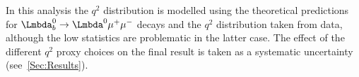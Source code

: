 
In this analysis the $q^{2}$ distribution is modelled using the theoretical predictions for $\Lb\to\PLambda^{0}\mup\mun$ decays and the $q^{2}$ distribution taken from \LbK data, although the low statistics are problematic in the latter case. The effect of the different $q^{2}$ proxy choices on the final result is taken as a systematic uncertainty (see~\autoref{Sec:Results}).








